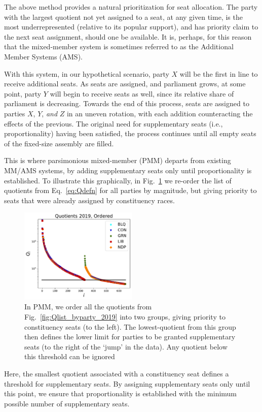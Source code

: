 The above method provides a natural prioritization for seat allocation.
The party with the largest quotient not yet assigned to a seat, at any given time, is the most underrepresented (relative to its popular support), and has priority claim to the next seat assignment, should one be available.
It is, perhaps, for this reason that the mixed-member system is sometimes referred to as the Additional Member Systems (AMS).

With this system, in our hypothetical scenario, party $X$ will be the first in line to receive additional seats. As seats are assigned, and parliament grows, at some point, party $Y$ will begin to receive seats as well, since its relative share of parliament is decreasing.
Towards the end of this process, seats are assigned to parties $X$, $Y$, \emph{and} $Z$ in an uneven rotation, with each addition counteracting the effects of the previous. The original need for supplementary seats (i.e., proportionality) having been satisfied, the process continues until all empty seats of the fixed-size assembly are filled.

This is where parsimonious mixed-member (PMM) departs from existing MM/AMS systems, by adding supplementary seats only until proportionality is established. To illustrate this graphically, in Fig.~\ref{fig:Qlist_all_2019} we re-order the list of quotients from Eq.~\ref{eq:Qdefn} for all parties by magnitude, but giving priority to seats that were already assigned by constituency races.
\begin{figure}
  \includegraphics[width=0.50\textwidth,clip]{PR_calcs/data/raw_2019/PMM_out/PMM_Qlist_all}
  \captionsetup{format=default}
  \caption{ In PMM, we order all the quotients from Fig.~\ref{fig:Qlist_byparty_2019} into two groups, giving priority to constituency seats (to the left). The lowest-quotient from this group then defines the lower limit for parties to be granted supplementary seats (to the right of the `jump' in the data). Any quotient below this threshold can be ignored }
\label{fig:Qlist_all_2019}
\end{figure}
Here, the smallest quotient associated with a constituency seat defines a threshold for supplementary seats. By assigning supplementary seats only until this point, we ensure that proportionality is established with the minimum possible number of supplementary seats.


